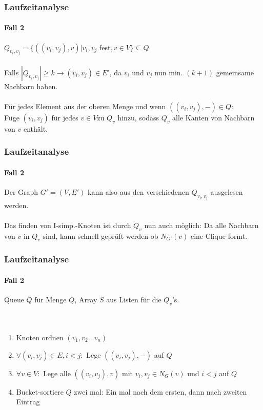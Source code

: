 \begin{frame}
\frametitle{Laufzeitanalyse}
\framesubtitle{Fall 2}

$Q_{v_i,v_j} = \{ ((v_i, v_j), v) | v_i, v_j$ fest$, v \in V \} \subseteq Q$ \\
\ \\
Falls $|Q_{v_i, v_j}| \geq k \rightarrow (v_i, v_j) \in E'$, da $v_i$ und $v_j$ nun min. $(k+1)$ gemeinsame Nachbarn haben. \\
\ \\
Für jedes Element aus der oberen Menge und wenn $((v_i, v_j), -) \in Q$: \\
Füge $(v_i, v_j)$ für jedes $v \in V $zu $Q_v$ hinzu, sodass $Q_v$ alle Kanten von Nachbarn von $v$ enthält.\\
\end{frame}


\begin{frame}
\frametitle{Laufzeitanalyse}
\framesubtitle{Fall 2}

Der Graph $G' = (V,E')$ kann also aus den verschiedenen $Q_{v_i,v_j}$ ausgelesen werden. \\
\ \\
Das finden von I-simp.-Knoten ist durch $Q_v$ nun auch möglich: Da alle Nachbarn von $v$ in $Q_v$ sind, kann schnell geprüft werden ob $N_{G'}(v)$ eine Clique formt.

\end{frame}


\begin{frame}
\frametitle{Laufzeitanalyse}
\framesubtitle{Fall 2}

Queue $Q$ für Menge $Q$, Array $S$ aus Listen für die $Q_v$'s. \\
\ \\
\ \\

\begin{enumerate}
	\item Knoten ordnen $(v_1, v_2 \dots v_n)$
	\item $\forall (v_i, v_j) \in E, i < j:$ Lege $((v_i, v_j), -)$ auf $Q$
	\item $\forall v \in V:$ Lege alle $((v_i, v_j), v)$ mit $v_i, v_j \in N_G(v)$ und $i < j$ auf $Q$
	\item Bucket-sortiere $Q$ zwei mal: Ein mal nach dem ersten, dann nach zweiten Eintrag
\end{enumerate}


\end{frame}


